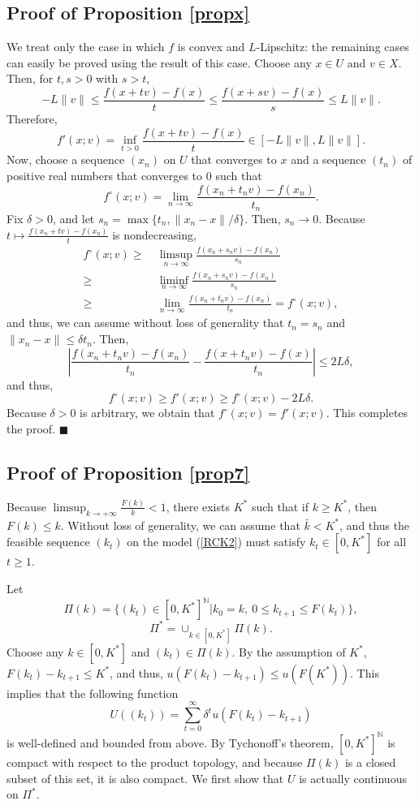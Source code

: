\documentclass[a4paper,12pt]{article}
\theoremstyle{definition}
\begin{document}
\subsection{Proof of Proposition \ref{propx}}
We treat only the case in which $f$ is convex and $L$-Lipschitz: the remaining cases can easily be proved using the result of this case. Choose any $x\in U$ and $v\in X$. Then, for $t,s>0$ with $s>t$,
\[-L\|v\|\le \frac{f(x+tv)-f(x)}{t}\le \frac{f(x+sv)-f(x)}{s}\le L\|v\|.\]
Therefore,
\[f'(x;v)=\inf_{t>0}\frac{f(x+tv)-f(x)}{t}\in [-L\|v\|,L\|v\|].\]
Now, choose a sequence $(x_n)$ on $U$ that converges to $x$ and a sequence $(t_n)$ of positive real numbers that converges to $0$ such that
\[f^{\circ}(x;v)=\lim_{n\to \infty}\frac{f(x_n+t_nv)-f(x_n)}{t_n}.\]
Fix $\delta>0$, and let $s_n=\max\{t_n,\|x_n-x\|/\delta\}$. Then, $s_n\to 0$. Because $t\mapsto \frac{f(x_n+tv)-f(x_n)}{t}$ is nondecreasing,
\begin{align*}
f^{\circ}(x;v)\ge&~\limsup_{n\to \infty}\frac{f(x_n+s_nv)-f(x_n)}{s_n}\\
\ge&~\liminf_{n\to \infty}\frac{f(x_n+s_nv)-f(x_n)}{s_n}\\
\ge&~\lim_{n\to \infty}\frac{f(x_n+t_nv)-f(x_n)}{t_n}=f^{\circ}(x;v),
\end{align*}
and thus, we can assume without loss of generality that $t_n=s_n$ and $\|x_n-x\|\le \delta t_n$. Then,
\[\left|\frac{f(x_n+t_nv)-f(x_n)}{t_n}-\frac{f(x+t_nv)-f(x)}{t_n}\right|\le 2L\delta,\]
and thus,
\[f^{\circ}(x;v)\ge f'(x;v)\ge f^{\circ}(x;v)-2L\delta.\]
Because $\delta>0$ is arbitrary, we obtain that $f^{\circ}(x;v)=f'(x;v)$. This completes the proof. $\blacksquare$



\subsection{Proof of Proposition \ref{prop7}}
Because $\limsup_{k\to +\infty}\frac{F(k)}{k}<1$, there exists $K^*$ such that if $k\ge K^*$, then $F(k)\le k$. Without loss of generality, we can assume that $\bar{k}<K^*$, and thus the feasible sequence $(k_t)$ on the model (\ref{RCK2}) must satisfy $k_t\in [0,K^*]$ for all $t\ge 1$.

Let
\[\Pi(k)=\{(k_t)\in [0,K^*]^{\mathbb{N}}|k_0=k,\ 0\le k_{t+1}\le F(k_t)\},\]
\[\Pi^*=\cup_{k\in [0,K^*]}\Pi(k).\]
Choose any $k\in [0,K^*]$ and $(k_t)\in \Pi(k)$. By the assumption of $K^*$, $F(k_t)-k_{t+1}\le K^*$, and thus, $u(F(k_t)-k_{t+1})\le u(F(K^*))$. This implies that the following function
\[U((k_t))=\sum_{t=0}^{\infty}\delta^tu(F(k_t)-k_{t+1})\]
is well-defined and bounded from above. By Tychonoff's theorem, $[0,K^*]^{\mathbb{N}}$ is compact with respect to the product topology, and because $\Pi(k)$ is a closed subset of this set, it is also compact. We first show that $U$ is actually continuous on $\Pi^*$.
\end{document}
